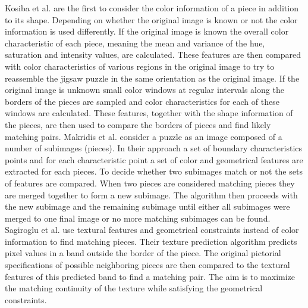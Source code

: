 \documentclass[11pt]{report}
\begin{document}
Kosiba et al. \cite{kosiba1994automatic} are the first to consider the color
information of a piece in addition to its shape. Depending on whether the
original image is known or not the color information is used differently. 
If the original image is known the overall color characteristic of each piece,
meaning the mean and variance of the hue, saturation and intensity values, are
calculated. These features are then compared with color characteristics of
various regions in the original image to try to reassemble the jigsaw puzzle in
the same orientation as the original image. If the original image is unknown
small color windows at regular intervals along the borders of the pieces are sampled
and color characteristics for each of these windows are calculated. These
features, together with the shape information of the pieces, are then used to
compare the borders of pieces and find likely matching pairs. Makridis et al.
\cite{makridis2006new} consider a puzzle as an image composed of a number of
subimages (pieces). In their approach a set of boundary characteristics points and for each
characteristic point a set of color and geometrical features are extracted for
each pieces. To decide whether two subimages match or not the sets of features
are compared. When two pieces are considered matching pieces they are
merged together to form a new subimage. The algorithm then proceeds with the new
subimage and the remaining subimage until either all subimages were merged to
one final image or no more matching subimages can be found. Sagiroglu et al.
\cite{sagiroglu2006texture} use textural features and geometrical constraints
instead of color information to find matching pieces. Their texture prediction
algorithm predicts pixel values in a band outside the border of the piece. The
original pictorial specifications of possible neighboring pieces are then
compared to the textural features of this predicted band to find a matching
pair. The aim is to maximize the matching continuity of the texture while
satisfying the geometrical constraints.
\end{document}
